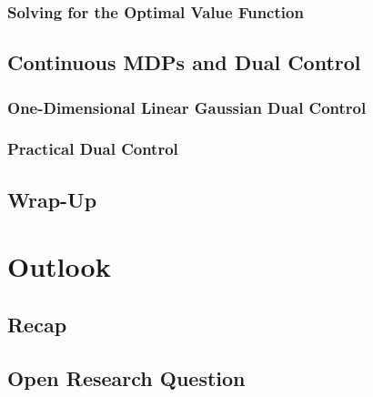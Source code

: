 		\subsection{Solving for the Optimal Value Function} %

	\section{Continuous MDPs and Dual Control} %

		\subsection{One-Dimensional Linear Gaussian Dual Control} %

		\subsection{Practical Dual Control} %

	\section{Wrap-Up} %

\chapter{Outlook} %

	\section{Recap} %

	\section{Open Research Question} %
